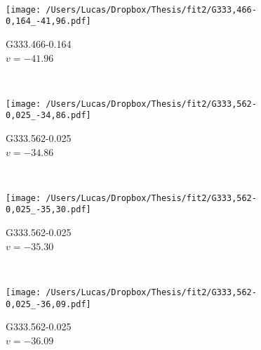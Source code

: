 \begin{figure*}[t]
\begin{subfigure}[t]{0.3\textwidth}
	\end{subfigure}
	~
	\begin{subfigure}[t]{0.3\textwidth}
		\texttt{[image: /Users/Lucas/Dropbox/Thesis/fit2/G333,466-0,164\_-41,96.pdf]}
		\caption[]{G333.466-0.164\\$v=-41.96$\,\kms}
	\end{subfigure}
	~
	\begin{subfigure}[t]{0.3\textwidth}
		\texttt{[image: /Users/Lucas/Dropbox/Thesis/fit2/G333,562-0,025\_-34,86.pdf]}
		\caption[]{G333.562-0.025\\$v=-34.86$\,\kms}
	\end{subfigure}
	~
	\begin{subfigure}[t]{0.3\textwidth}
		\texttt{[image: /Users/Lucas/Dropbox/Thesis/fit2/G333,562-0,025\_-35,30.pdf]}
		\caption[]{G333.562-0.025\\$v=-35.30$\,\kms}
	\end{subfigure}
	~
	\begin{subfigure}[t]{0.3\textwidth}
		\texttt{[image: /Users/Lucas/Dropbox/Thesis/fit2/G333,562-0,025\_-36,09.pdf]}
		\caption[]{G333.562-0.025\\$v=-36.09$\,\kms}
	\end{subfigure}
	~
\end{figure*}
\clearpage
